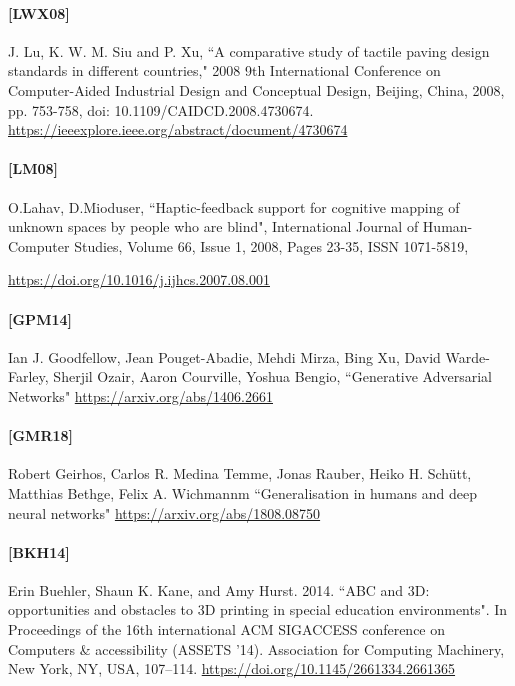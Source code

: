 \documentclass[12pt, letterpaper]{article}
\begin{document}
\paragraph{[LWX08]}
\hypertarget{LWXtarget}{}
J. Lu, K. W. M. Siu and P. Xu, ``A comparative study of tactile paving design standards in different countries," 2008 9th International Conference on\\
Computer-Aided Industrial Design and Conceptual Design, Beijing, China, 2008, pp. 753-758, doi: 10.1109/CAIDCD.2008.4730674.\\
\href{https://ieeexplore.ieee.org/abstract/document/4730674}{https://ieeexplore.ieee.org/abstract/document/4730674}

\paragraph{[LM08]}
\hypertarget{LM08target}{}
O.Lahav, D.Mioduser, ``Haptic-feedback support for cognitive mapping of unknown spaces by people who are blind", International Journal of Human-Computer Studies, Volume 66, Issue 1,
2008, Pages 23-35, ISSN 1071-5819,

\href{https://doi.org/10.1016/j.ijhcs.2007.08.001}{https://doi.org/10.1016/j.ijhcs.2007.08.001}

\paragraph{[GPM14]}
\hypertarget{GPM14target}{}
Ian J. Goodfellow, Jean Pouget-Abadie, Mehdi Mirza, Bing Xu, David Warde-Farley, Sherjil Ozair, Aaron Courville, Yoshua Bengio, ``Generative Adversarial Networks"
\href{https://arxiv.org/abs/1406.2661}{https://arxiv.org/abs/1406.2661}

\paragraph{[GMR18]}
\hypertarget{GMR18target}{}
Robert Geirhos, Carlos R. Medina Temme, Jonas Rauber, Heiko H. Schütt, Matthias Bethge, Felix A. Wichmannm ``Generalisation in humans and deep neural networks"
\href{https://arxiv.org/abs/1808.08750}{https://arxiv.org/abs/1808.08750}

\paragraph{[BKH14]}
\hypertarget{BKH14target}{}
Erin Buehler, Shaun K. Kane, and Amy Hurst. 2014. ``ABC and 3D: opportunities and obstacles to 3D printing in special education environments".
In Proceedings of the 16th international ACM SIGACCESS conference on Computers \& accessibility (ASSETS '14). Association for Computing Machinery, New York, NY, USA, 107–114.
\href{https://doi.org/10.1145/2661334.2661365}{https://doi.org/10.1145/2661334.2661365}
\end{document}
